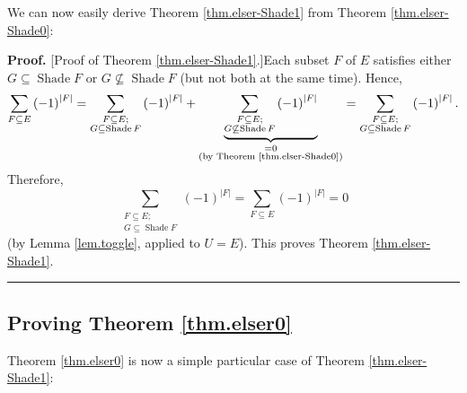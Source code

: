 \documentclass[numbers=enddot,12pt,final,onecolumn]{scrartcl}%
\theoremstyle{definition}
\newenvironment{proof}[1][Proof]{\noindent\textbf{#1.} }{\ \rule{0.5em}{0.5em}}
\let\sumnonlimits\sum
\renewcommand{\sum}{\sumnonlimits\limits}
\begin{document}
We can now easily derive Theorem \ref{thm.elser-Shade1} from Theorem
\ref{thm.elser-Shade0}:

\begin{proof}
[Proof of Theorem \ref{thm.elser-Shade1}.]Each subset $F$ of $E$ satisfies
either $G\subseteq\operatorname*{Shade}F$ or $G\not \subseteq
\operatorname*{Shade}F$ (but not both at the same time). Hence,%
\[
\sum_{F\subseteq E}\left(  -1\right)  ^{\left\vert F\right\vert }%
=\sum_{\substack{F\subseteq E;\\G\subseteq\operatorname*{Shade}F}}\left(
-1\right)  ^{\left\vert F\right\vert }+\underbrace{\sum_{\substack{F\subseteq
E;\\G\not \subseteq \operatorname*{Shade}F}}\left(  -1\right)  ^{\left\vert
F\right\vert }}_{\substack{=0\\\text{(by Theorem \ref{thm.elser-Shade0})}%
}}=\sum_{\substack{F\subseteq E;\\G\subseteq\operatorname*{Shade}F}}\left(
-1\right)  ^{\left\vert F\right\vert }.
\]
Therefore,%
\[
\sum_{\substack{F\subseteq E;\\G\subseteq\operatorname*{Shade}F}}\left(
-1\right)  ^{\left\vert F\right\vert }=\sum_{F\subseteq E}\left(  -1\right)
^{\left\vert F\right\vert }=0
\]
(by Lemma \ref{lem.toggle}, applied to $U=E$). This proves Theorem
\ref{thm.elser-Shade1}.
\end{proof}

\subsection{Proving Theorem \ref{thm.elser0}}

Theorem \ref{thm.elser0} is now a simple particular case of Theorem
\ref{thm.elser-Shade1}:
\end{document}
